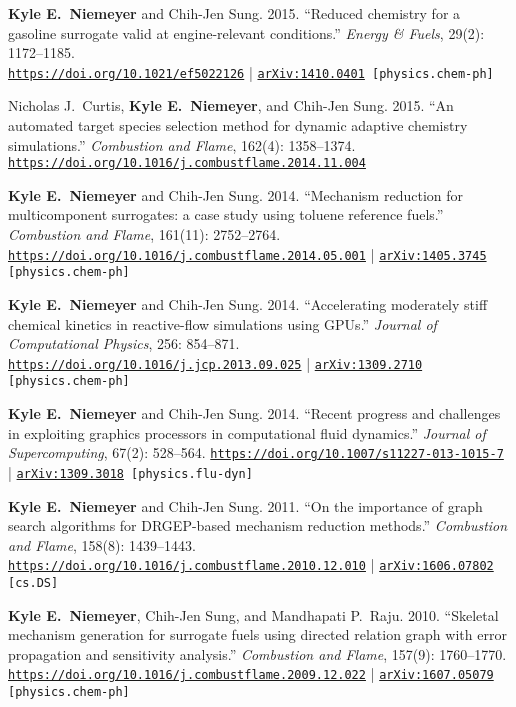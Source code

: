 \documentclass[margin,line,11pt]{res}
\makeatletter
\newlength{\bibhang}
\newlength{\bibsep}
 {\@listi \global\bibsep\itemsep \global\advance\bibsep by\parsep}
\newenvironment{bibenum*}
  {\renewcommand\labelenumi{\theenumi.}%
   \etaremune[
     topsep=0pt,
     itemsep=\bibsep,
     parsep=0pt,partopsep=0pt,
     itemindent=-\bibhang,
     leftmargin={\bibhang+\widthof{[999]}}]}
  {\endetaremune}
\newcommand*{\doi}[1]{\href{https://doi.org/#1}{\nolinkurl{https://doi.org/#1}}}
\makeatother
\begin{document}
\begin{resume}
\begin{bibenum*}
\item \textbf{Kyle E.\ Niemeyer} and Chih-Jen Sung.
2015.
``Reduced chemistry for a gasoline surrogate valid at engine-relevant conditions.''
\emph{Energy \& Fuels}, 29(2): 1172--1185. \\
\doi{10.1021/ef5022126} |
{\tt \href{http://arxiv.org/abs/1410.0401}{arXiv:1410.0401} [physics.chem-ph]}

\item Nicholas J.\ Curtis, \textbf{Kyle E.\ Niemeyer}, and Chih-Jen Sung.
2015.
``An automated target species selection method for dynamic adaptive chemistry simulations.''
\emph{Combustion and Flame}, 162(4): 1358--1374.
\doi{10.1016/j.combustflame.2014.11.004}

\item \textbf{Kyle E.\ Niemeyer} and Chih-Jen Sung.
2014.
``Mechanism reduction for multicomponent surrogates: a case study using toluene reference fuels.''
\emph{Combustion and Flame}, 161(11): 2752--2764.
\doi{10.1016/j.combustflame.2014.05.001} |
{\tt \href{http://arxiv.org/abs/1405.3745}{arXiv:1405.3745} [physics.chem-ph]}

\item \textbf{Kyle E.\ Niemeyer} and Chih-Jen Sung.
2014.
``Accelerating moderately stiff chemical kinetics in reactive-flow simulations using GPUs.''
\emph{Journal of Computational Physics}, 256: 854--871. \\
\doi{10.1016/j.jcp.2013.09.025} |
{\tt \href{http://arxiv.org/abs/1309.2710}{arXiv:1309.2710} [physics.chem-ph]}

\item \textbf{Kyle E.\ Niemeyer} and Chih-Jen Sung.
2014.
``Recent progress and challenges in exploiting graphics processors in computational fluid dynamics.''
\emph{Journal of Supercomputing}, 67(2): 528--564.
\doi{10.1007/s11227-013-1015-7} |
{\tt \href{http://arxiv.org/abs/1309.3018}{arXiv:1309.3018} [physics.flu-dyn]}

\item \textbf{Kyle E.\ Niemeyer} and Chih-Jen Sung.
2011.
``On the importance of graph search algorithms for DRGEP-based mechanism reduction methods.''
\emph{Combustion and Flame}, 158(8): 1439--1443.
\doi{10.1016/j.combustflame.2010.12.010} |
{\tt \href{http://arxiv.org/abs/1606.07802}{arXiv:1606.07802} [cs.DS]}

\item \textbf{Kyle E.\ Niemeyer}, Chih-Jen Sung, and Mandhapati P.\ Raju.
2010.
``Skeletal mechanism generation for surrogate fuels using directed relation graph with error propagation and sensitivity analysis.''
\emph{Combustion and Flame}, 157(9): 1760--1770. \\
\doi{10.1016/j.combustflame.2009.12.022} |
{\tt \href{http://arxiv.org/abs/1607.05079}{arXiv:1607.05079} [physics.chem-ph]}


\end{bibenum*}
\end{resume}
\end{document}
